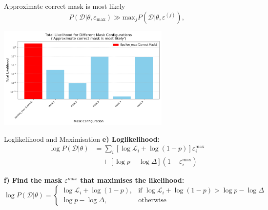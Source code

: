 \documentclass[aspectratio=169]{beamer}
\begin{document}
\begin{frame}{Approximate correct mask is most likely}
  \footnotesize
  \begin{equation}
      P(\mathcal{D}|\theta, \varepsilon_{\mathrm{max}}) \gg \mathrm{max}_j P(\mathcal{D}|\theta,\varepsilon^{(j)})\label{eq:nlo},
  \end{equation}
  \begin{center}
    \includegraphics[width=0.64\textwidth]{images/dominant_mask_plot.png}
  \end{center}
\end{frame}

\begin{frame}{Loglikelihood and Maximisation}
  \footnotesize
  \textbf{e) Loglikelihood:}
  \begin{align}
      \log{P(\mathcal{D}|\theta)} &= \sum_{i}[\log{\mathcal{L}_i}+\log(1-p)]\varepsilon^{\mathrm{max}}_i \nonumber\\
      &\quad + [\log{p} - \log{\Delta}](1 - \varepsilon^\mathrm{max}_i)
  \end{align}

  \textbf{f) Find the mask $\varepsilon^{max}$ that maximises the likelihood:}
  \begin{equation}
  \log P(\mathcal{D}|\theta) =
  \begin{cases}
  \log \mathcal{L}_i + \log(1 - p), & \text{if } \log \mathcal{L}_i + \log(1 - p) > \log p - \log \Delta \\
  \log p - \log \Delta, & \text{otherwise}
  \end{cases}
  \end{equation}
\end{frame}
\end{document}
